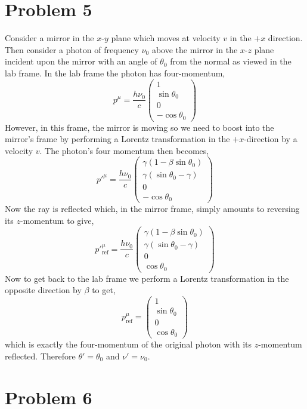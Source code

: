 \documentclass[12pt]{article}
\begin{document}
\section{Problem 5}

Consider a mirror in the $x$-$y$ plane which moves at velocity $v$ in the $+x$ direction. Then consider a photon of frequency $\nu_0$ above the mirror in the $x$-$z$ plane incident upon the mirror with an angle of $\theta_0$ from the normal as viewed in the lab frame. In the lab frame the photon has four-momentum,
\[ p^\mu = \frac{h \nu_0}{c}
\begin{pmatrix}
1
\\
\sin{\theta_0}
\\
0
\\
-\cos{\theta_0}
\end{pmatrix}
\]
However, in this frame, the mirror is moving so we need to boost into the mirror's frame by performing a Lorentz transformation in the $+x$-direction by a velocity $v$. The photon's four momentum then becomes,
\[ p'^\mu = \frac{h \nu_0}{c}
\begin{pmatrix}
\gamma (1 - \beta \sin{\theta_0} )
\\
\gamma ( \sin{\theta_0} - \gamma)
\\
0
\\
-\cos{\theta_0}
\end{pmatrix}
\]
Now the ray is reflected which, in the mirror frame, simply amounts to reversing its $z$-momentum to give,
\[ p'^\mu_{\text{ref}} = \frac{h \nu_0}{c}
\begin{pmatrix}
\gamma (1 - \beta \sin{\theta_0} )
\\
\gamma ( \sin{\theta_0} - \gamma)
\\
0
\\
\cos{\theta_0}
\end{pmatrix}
\]
Now to get back to the lab frame we perform a Lorentz transformation in the opposite direction by $\beta$ to get,
\[ p^\mu_{\text{ref}} = \begin{pmatrix}
1
\\
\sin{\theta_0}
\\
0
\\
\cos{\theta_0}
\end{pmatrix}
\]
which is exactly the four-momentum of the original photon with its $z$-momentum reflected. Therefore $\theta' = \theta_0$ and $\nu' = \nu_0$. 

\section{Problem 6}
\end{document}
